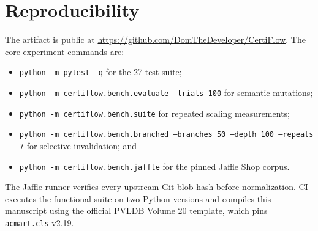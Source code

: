 \section{Reproducibility}

The artifact is public at \url{https://github.com/DomTheDeveloper/CertiFlow}. The core experiment commands are:
\begin{itemize}
  \item \texttt{python -m pytest -q} for the 27-test suite;
  \item \texttt{python -m certiflow.bench.evaluate --trials 100} for semantic mutations;
  \item \texttt{python -m certiflow.bench.suite} for repeated scaling measurements;
  \item \texttt{python -m certiflow.bench.branched --branches 50 --depth 100 --repeats 7} for selective invalidation; and
  \item \texttt{python -m certiflow.bench.jaffle} for the pinned Jaffle Shop corpus.
\end{itemize}
The Jaffle runner verifies every upstream Git blob hash before normalization. CI executes the functional suite on two Python versions and compiles this manuscript using the official PVLDB Volume 20 template, which pins \texttt{acmart.cls} v2.19.
